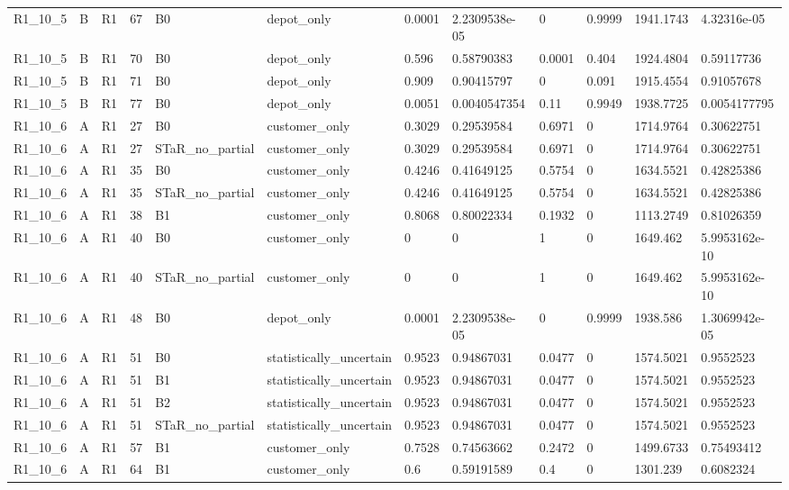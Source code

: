 \begin{longtable}{llllllllllll}
R1\_10\_5 & B & R1 & 67 & B0 & depot\_only & 0.0001 & 2.2309538e-05 & 0 & 0.9999 & 1941.1743 & 4.32316e-05 \\
R1\_10\_5 & B & R1 & 70 & B0 & depot\_only & 0.596 & 0.58790383 & 0.0001 & 0.404 & 1924.4804 & 0.59117736 \\
R1\_10\_5 & B & R1 & 71 & B0 & depot\_only & 0.909 & 0.90415797 & 0 & 0.091 & 1915.4554 & 0.91057678 \\
R1\_10\_5 & B & R1 & 77 & B0 & depot\_only & 0.0051 & 0.0040547354 & 0.11 & 0.9949 & 1938.7725 & 0.0054177795 \\
R1\_10\_6 & A & R1 & 27 & B0 & customer\_only & 0.3029 & 0.29539584 & 0.6971 & 0 & 1714.9764 & 0.30622751 \\
R1\_10\_6 & A & R1 & 27 & STaR\_no\_partial & customer\_only & 0.3029 & 0.29539584 & 0.6971 & 0 & 1714.9764 & 0.30622751 \\
R1\_10\_6 & A & R1 & 35 & B0 & customer\_only & 0.4246 & 0.41649125 & 0.5754 & 0 & 1634.5521 & 0.42825386 \\
R1\_10\_6 & A & R1 & 35 & STaR\_no\_partial & customer\_only & 0.4246 & 0.41649125 & 0.5754 & 0 & 1634.5521 & 0.42825386 \\
R1\_10\_6 & A & R1 & 38 & B1 & customer\_only & 0.8068 & 0.80022334 & 0.1932 & 0 & 1113.2749 & 0.81026359 \\
R1\_10\_6 & A & R1 & 40 & B0 & customer\_only & 0 & 0 & 1 & 0 & 1649.462 & 5.9953162e-10 \\
R1\_10\_6 & A & R1 & 40 & STaR\_no\_partial & customer\_only & 0 & 0 & 1 & 0 & 1649.462 & 5.9953162e-10 \\
R1\_10\_6 & A & R1 & 48 & B0 & depot\_only & 0.0001 & 2.2309538e-05 & 0 & 0.9999 & 1938.586 & 1.3069942e-05 \\
R1\_10\_6 & A & R1 & 51 & B0 & statistically\_uncertain & 0.9523 & 0.94867031 & 0.0477 & 0 & 1574.5021 & 0.9552523 \\
R1\_10\_6 & A & R1 & 51 & B1 & statistically\_uncertain & 0.9523 & 0.94867031 & 0.0477 & 0 & 1574.5021 & 0.9552523 \\
R1\_10\_6 & A & R1 & 51 & B2 & statistically\_uncertain & 0.9523 & 0.94867031 & 0.0477 & 0 & 1574.5021 & 0.9552523 \\
R1\_10\_6 & A & R1 & 51 & STaR\_no\_partial & statistically\_uncertain & 0.9523 & 0.94867031 & 0.0477 & 0 & 1574.5021 & 0.9552523 \\
R1\_10\_6 & A & R1 & 57 & B1 & customer\_only & 0.7528 & 0.74563662 & 0.2472 & 0 & 1499.6733 & 0.75493412 \\
R1\_10\_6 & A & R1 & 64 & B1 & customer\_only & 0.6 & 0.59191589 & 0.4 & 0 & 1301.239 & 0.6082324 \\

\end{longtable}
